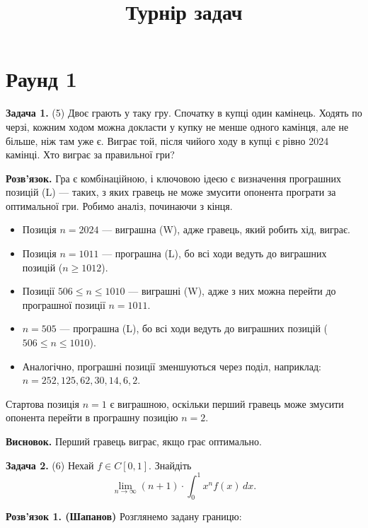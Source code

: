 \documentclass{article}
\begin{document}
\title{\textbf{Турнір задач}}
\author{}
\date{}

\maketitle

\section*{\centering \textbf{Раунд 1}}

\textbf{Задача 1.} (5) Двоє грають у таку гру. Спочатку в купці один камінець. Ходять по черзі, кожним ходом можна докласти у купку не менше одного камінця, але не більше, ніж там уже є. Виграє той, після чийого ходу в купці є рівно 2024 камінці. Хто виграє за правильної гри?

\textbf{Розв’язок.} Гра є комбінаційною, і ключовою ідеєю є визначення програшних позицій (L) — таких, з яких гравець не може змусити опонента програти за оптимальної гри. Робимо аналіз, починаючи з кінця.

\begin{itemize}
    \item Позиція \( n = 2024 \) — виграшна (W), адже гравець, який робить хід, виграє.
    \item Позиція \( n = 1011 \) — програшна (L), бо всі ходи ведуть до виграшних позицій (\( n \geq 1012 \)).
    \item Позиції \( 506 \leq n \leq 1010 \) — виграшні (W), адже з них можна перейти до програшної позиції \( n = 1011 \).
    \item \( n = 505 \) — програшна (L), бо всі ходи ведуть до виграшних позицій (\( 506 \leq n \leq 1010 \)).
    \item Аналогічно, програшні позиції зменшуються через поділ, наприклад: \( n = 252, 125, 62, 30, 14, 6, 2 \).
\end{itemize}

Стартова позиція \( n = 1 \) є виграшною, оскільки перший гравець може змусити опонента перейти в програшну позицію \( n = 2 \).

\textbf{Висновок.} Перший гравець виграє, якщо грає оптимально.

\bigskip

\noindent\textbf{Задача 2.} (6) Нехай \( f \in C[0, 1] \). Знайдіть  
\[
\lim_{n \to \infty} (n + 1) \cdot \int_{0}^{1} x^n f(x) \, dx.
\]

\textbf{Розв’язок 1. (Шапанов)} Розглянемо задану границю:
\end{document}
